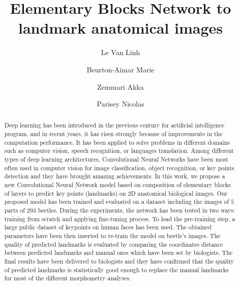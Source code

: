 \documentclass[review]{elsarticle}
\begin{document}
\begin{frontmatter}

\title{Elementary Blocks Network to landmark anatomical images}


\author[labri,itdlu]{Le Van Linh}
\author[labri]{Beurton-Aimar Marie}
\author[labri]{Zemmari Akka}
\author[igepp]{Parisey Nicolas}


\address[labri]{University of Bordeaux, 351, cours de la Liberation, 33405 Talence, France}

\address[igepp]{UMR 1349 IGEPP, BP 35327, 35653 Le Rheu, France}
\address[itdlu]{Dalat University, Dalat, Lam Dong, Vietnam}

\begin{abstract}
Deep learning has been introduced in the previous century for
artificial intelligence program, and in recent years, it has risen
strongly because of improvements in the computation performance. It
has been applied to solve problems in different domains such as
computer vision, speech recognition, or languages translation. Among
different types of deep learning architectures, Convolutional Neural
Networks have been most often used in computer vision for image
classification, object recognition, or key points detection and they
have brought amazing achievements. In this work, we propose a new
Convolutional Neural Network model based on composition of elementary
blocks of layers to predict key points (landmarks) on 2D anatomical
biological images. Our proposed model has been trained and evaluated
on a dataset including the images of $5$ parts of $293$
beetles. During the experiments, the network has been tested in two
ways: training from scratch and applying fine-tuning process. To lead
the pre-training step, a large public dataset of keypoints on human
faces has been used. The obtained parameters have been then inserted
to re-train the model on beetle's images. The quality of predicted
landmarks is evaluated by comparing the coordinates distance between
predicted landmarks and manual ones which have been set by
biologists. The final results have been delivered to biologists and
they have confirmed that the quality of predicted landmarks is
statistically good enough to replace the manual landmarks for most of
the different morphometry analyses.


\end{abstract}
\end{frontmatter}
\end{document}
